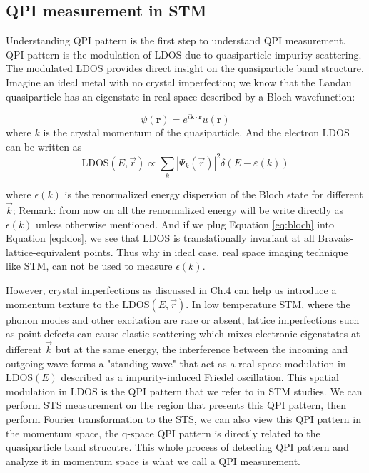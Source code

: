\subsection{QPI measurement in STM}
Understanding QPI pattern is the first step to understand QPI measurement. QPI pattern is the modulation of \ac{LDOS} due to quasiparticle-impurity scattering. The modulated \ac{LDOS} provides direct insight on the quasiparticle band structure. Imagine an ideal metal with no crystal imperfection; we know that the Landau quasiparticle has an eigenstate in real space described by a Bloch wavefunction: 

\begin{equation}
\psi(\mathbf{r}) = e^{i \mathbf{k} \cdot \mathbf{r}} u(\mathbf{r})
\label{eq:bloch}
\end{equation} 
where $k$ is the crystal momentum of the quasiparticle. And the electron \ac{LDOS} can be written as  
\begin{equation}
\text{LDOS}(E, \vec{r}) \propto \sum_k |\Psi_k(\vec{r})|^2 \delta(E - \varepsilon(k))
\label{eq:ldos}
\end{equation}

where  $\epsilon(k)$ is the renormalized energy dispersion of the Bloch state for different $\vec{k}$; Remark: from now on all the renormalized energy will be write directly as $\epsilon(k)$ unless otherwise mentioned. And if we plug Equation \ref{eq:bloch} into Equation \ref{eq:ldos}, we see that $\text{LDOS}$ is translationally invariant at all Bravais-lattice-equivalent points. Thus why in ideal case, real space imaging technique like \ac{STM}, can not be used to measure $\epsilon(k)$. 

However, crystal imperfections as discussed in Ch.4 can help us introduce a momentum texture to the $\text{LDOS}(E, \vec{r})$. In low temperature STM, where the phonon modes and other excitation are rare or absent, lattice imperfections such as point defects can cause elastic scattering which mixes electronic eigenstates at different $\vec{k}$ but at the same energy, the interference between the incoming and outgoing wave forms a "standing wave" that act as a real space modulation in $\text{LDOS}(E)$ described as a impurity-induced Friedel oscillation\cite{benaFriedelOscillationsDecoding2016}. This spatial modulation in $\text{LDOS}$ is the QPI pattern that we refer to in STM studies. We can perform \ac{STS} measurement on the region that presents this QPI pattern, then perform Fourier transformation to the STS, we can also view this QPI pattern in the momentum space, the q-space QPI pattern is directly related to the quasiparticle band strucutre. This whole process of detecting QPI pattern and analyze it in momentum space is what we call a QPI measurement. 


